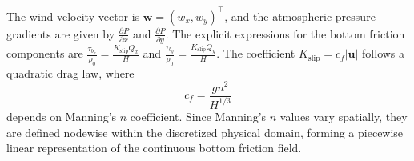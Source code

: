 \documentclass[final,1p,times]{elsarticle}
\begin{document}
The wind velocity vector is $ \mathbf{w} = (w_x, w_y)^\top $, and the atmospheric pressure gradients are given by $ \frac{\partial P}{\partial x} $ and $ \frac{\partial P}{\partial y} $. The explicit expressions for the bottom friction components are $ \frac{\tau_{b_x}}{\rho_0}=\frac{K_{\text{slip}} Q_x}{H} $ and $ \frac{\tau_{b_y}}{\rho_0}=\frac{K_{\text{slip}} Q_y}{H} $. 
The coefficient $ K_{\text{slip}}=c_f|\mathbf{u}| $ follows a quadratic drag law, where
\begin{equation}
c_f=\frac{g n^2}{H^{1 / 3}}     \label{eq:mann_fric}
\end{equation}
depends on Manning’s $ n $ coefficient. 
Since Manning’s $ n $ values vary spatially, they are defined nodewise within the discretized physical domain, forming a piecewise linear representation of the continuous bottom friction field.
\end{document}
